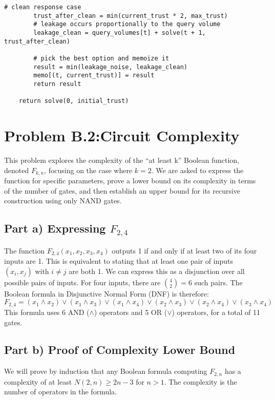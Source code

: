 \documentclass{solutionclass} %
\begin{document}
\begin{lstlisting}[style=pythonstyle, caption={Python implementation of the solution for Problem B.1: Defense Against Model Extraction}, label={lst:problem_b1_solution}]
        # clean response case
        trust_after_clean = min(current_trust * 2, max_trust)
        # leakage occurs proportionally to the query volume
        leakage_clean = query_volumes[t] + solve(t + 1, trust_after_clean)
        
        # pick the best option and memoize it
        result = min(leakage_noise, leakage_clean)
        memo[(t, current_trust)] = result
        return result

    return solve(0, initial_trust)
\end{lstlisting}

\section{\hspace{4pt}Problem B.2:\@ Circuit Complexity}\label{sec:problem_b2}
This problem explores the complexity of the ``at least k'' Boolean function, denoted $F_{k,n}$, focusing on the case where $k=2$. We are asked to express the function for specific parameters, prove a lower bound on its complexity in terms of the number of gates, and then establish an upper bound for its recursive construction using only NAND gates.

\subsection{Part a) Expressing $F_{2,4}$}
The function $F_{2,4}(x_1, x_2, x_3, x_4)$ outputs 1 if and only if at least two of its four inputs are 1. This is equivalent to stating that at least one pair of inputs $(x_i, x_j)$ with $i \neq j$ are both 1. We can express this as a disjunction over all possible pairs of inputs. For four inputs, there are $\binom{4}{2} = 6$ such pairs. The Boolean formula in Disjunctive Normal Form (DNF) is therefore:
\begin{equation}
    F_{2,4} = (x_1 \land x_2) \lor (x_1 \land x_3) \lor (x_1 \land x_4) \lor (x_2 \land x_3) \lor (x_2 \land x_4) \lor (x_3 \land x_4)
\end{equation}
This formula uses 6 AND ($\land$) operators and 5 OR ($\lor$) operators, for a total of 11 gates.

\subsection{Part b) Proof of Complexity Lower Bound}
We will prove by induction that any Boolean formula computing $F_{2,n}$ has a complexity of at least $N(2, n) \geq 2n - 3$ for $n > 1$. The complexity is the number of operators in the formula.
\end{document}
